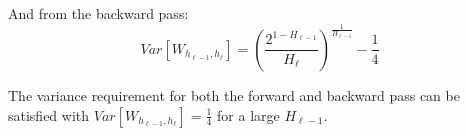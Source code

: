 And from the backward pass:
\begin{equation}
Var[W_{h_{\ell-1},h_\ell}] = \left( \frac{ 2^{1 - H_{\ell-1}} }{H_{\ell}} \right)^{\frac{1}{H_{\ell-1}}} - \frac{1}{4}
\end{equation}

The variance requirement for both the forward and backward pass can be satisfied with  $Var[W_{h_{\ell-1},h_\ell}] = \frac{1}{4}$ for a large $H_{\ell-1}$.
